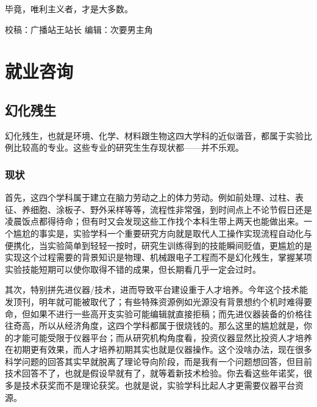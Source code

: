 \documentclass[]{book}
\begin{document}
毕竟，唯利主义者，才是大多数。

校稿：广播站王站长
编辑：次要男主角

\hypertarget{career}{%
\chapter{就业咨询}\label{career}}

\hypertarget{ux5e7bux5316ux6b8bux751f}{%
\section{幻化残生}\label{ux5e7bux5316ux6b8bux751f}}

幻化残生，也就是环境、化学、材料跟生物这四大学科的近似谐音，都属于实验比例比较高的专业。这些专业的研究生生存现状都------并不乐观。

\hypertarget{ux73b0ux72b6}{%
\subsection{现状}\label{ux73b0ux72b6}}

首先，这四个学科属于建立在脑力劳动之上的体力劳动。例如前处理、过柱、表征、养细胞、涂板子、野外采样等等，流程性非常强，到时间点上不论节假日还是凌晨饭点都得待命；但有时又会发现这些工作找个本科生带上两天也能做出来。一个尴尬的事实是，实验学科一个重要研究方向就是取代人工操作实现流程自动化与便携化，当实验简单到轻轻一按时，研究生训练得到的技能瞬间贬值，更尴尬的是实现这个过程需要的背景知识是物理、机械跟电子工程而不是幻化残生，掌握某项实验技能短期可以使你取得不错的成果，但长期看几乎一定会过时。

其次，特别拼先进仪器/技术，进而导致平台建设重于人才培养。今年这个技术能发顶刊，明年就可能被取代了；有些特殊资源例如光源没有背景想约个机时难得要命，但如果不进行一些高开支实验可能编辑就直接拒稿；而先进仪器装备的价格往往奇高，所以从经济角度，这四个学科都属于很烧钱的。那么这里的尴尬就是，你的才能可能受限于仪器平台；而从研究机构角度看，投资仪器显然比投资人才培养在初期更有效果，而人才培养初期其实也就是仪器操作。这个没啥办法，现在很多科学问题的回答其实早就脱离了理论导向阶段，而是我有一个问题想回答，但目前技术回答不了，也就是假设早就有了，就等着新技术检验。你去看这些年诺奖，很多是技术获奖而不是理论获奖。也就是说，实验学科比起人才更需要仪器平台资源。
\end{document}
